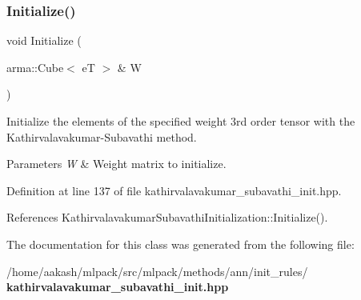 \subsubsection{Initialize()\hspace{0.1cm}{\footnotesize\ttfamily [4/4]}}
{\footnotesize\ttfamily void Initialize (\begin{DoxyParamCaption}\item[{arma\+::\+Cube$<$ eT $>$ \&}]{W }\end{DoxyParamCaption})\hspace{0.3cm}{\ttfamily [inline]}}



Initialize the elements of the specified weight 3rd order tensor with the Kathirvalavakumar-\/\+Subavathi method. 


\begin{DoxyParams}{Parameters}
{\em W} & Weight matrix to initialize. \\
\hline
\end{DoxyParams}


Definition at line 137 of file kathirvalavakumar\+\_\+subavathi\+\_\+init.\+hpp.



References Kathirvalavakumar\+Subavathi\+Initialization\+::\+Initialize().



The documentation for this class was generated from the following file\+:\begin{DoxyCompactItemize}
\item 
/home/aakash/mlpack/src/mlpack/methods/ann/init\+\_\+rules/\textbf{ kathirvalavakumar\+\_\+subavathi\+\_\+init.\+hpp}\end{DoxyCompactItemize}
